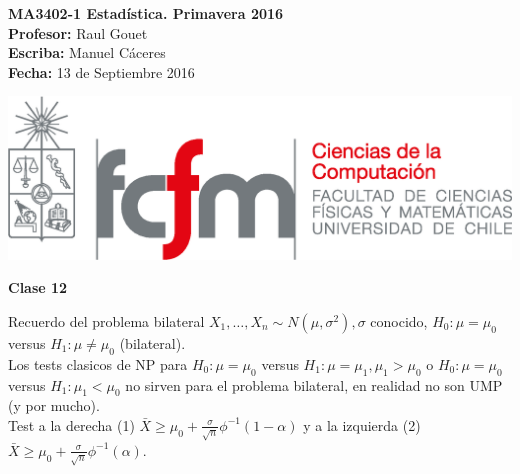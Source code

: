 \documentclass[10pt]{article}
\theoremstyle{plain}
\theoremstyle{definition}
\newcommand{\catnum}{12} %
\newcommand{\fecha}{13 de Septiembre 2016 }
\begin{document}
\vspace*{-1.2 cm}
\begin{minipage}{0.6\textwidth}
\begin{flushleft}
\hspace*{-0.5cm}\textbf{MA3402-1 Estadística. Primavera 2016}\\
\hspace*{-0.5cm}\textbf{Profesor:} Raul Gouet\\
\hspace*{-0.5cm}\textbf{Escriba:} Manuel Cáceres\\
\hspace*{-0.5cm}\textbf{Fecha:} \fecha
\end{flushleft}
\end{minipage}
\begin{minipage}{0.36\textwidth}
\begin{flushright}
\includegraphics[scale=0.3]{imagenes/fcfm_dcc}
\end{flushright}
\end{minipage}
\bigskip

\begin{center}
\LARGE\textbf{Clase \catnum}
\end{center}
Recuerdo del problema bilateral $X_{1},\ldots,X_{n} \sim N(\mu,\sigma^2), \sigma$ conocido, $H_{0}: \mu=\mu_{0}$ versus $H_{1}: \mu \not = \mu_{0}$ (bilateral).\\

Los tests clasicos de NP para $H_{0}: \mu=\mu_{0}$ versus $H_{1}: \mu=\mu_{1}, \mu_{1}>\mu_{0}$ o $H_{0}: \mu=\mu_{0}$ versus $H_{1}: \mu_{1}<\mu_{0}$ no sirven para el problema bilateral, en realidad no son UMP (y por mucho).\\

Test a la derecha (1) $\bar{X} \ge \mu_{0} + \frac{\sigma}{\sqrt{n}}\phi^{-1}(1-\alpha)$ y a la izquierda (2) $\bar{X} \ge \mu_{0} + \frac{\sigma}{\sqrt{n}}\phi^{-1}(\alpha)$.\\
\end{document}
